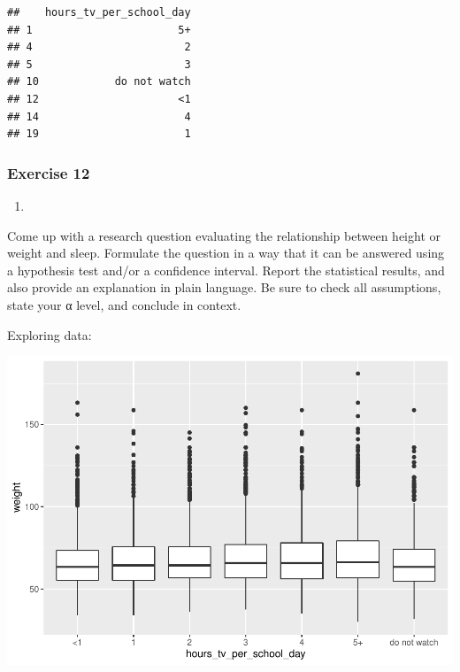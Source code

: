 \documentclass[
]{article}
\newenvironment{Shaded}{\begin{snugshade}}{\end{snugshade}}
\newcommand{\DataTypeTok}[1]{\textcolor[rgb]{0.13,0.29,0.53}{#1}}
\newcommand{\KeywordTok}[1]{\textcolor[rgb]{0.13,0.29,0.53}{\textbf{#1}}}
\newcommand{\NormalTok}[1]{#1}
\newcommand{\OperatorTok}[1]{\textcolor[rgb]{0.81,0.36,0.00}{\textbf{#1}}}
\newcommand{\StringTok}[1]{\textcolor[rgb]{0.31,0.60,0.02}{#1}}
\begin{document}
\begin{verbatim}
##    hours_tv_per_school_day
## 1                       5+
## 4                        2
## 5                        3
## 10            do not watch
## 12                      <1
## 14                       4
## 19                       1
\end{verbatim}

\hypertarget{exercise-12}{%
\subsubsection{Exercise 12}\label{exercise-12}}

\begin{enumerate}
\def\labelenumi{\arabic{enumi}.}
\item
\end{enumerate}

Come up with a research question evaluating the relationship between
height or weight and sleep. Formulate the question in a way that it can
be answered using a hypothesis test and/or a confidence interval. Report
the statistical results, and also provide an explanation in plain
language. Be sure to check all assumptions, state your α level, and
conclude in context.

Exploring data:

\begin{Shaded}
\end{Shaded}

\includegraphics{lab_7_files/figure-latex/unnamed-chunk-19-1.pdf}
\end{document}
